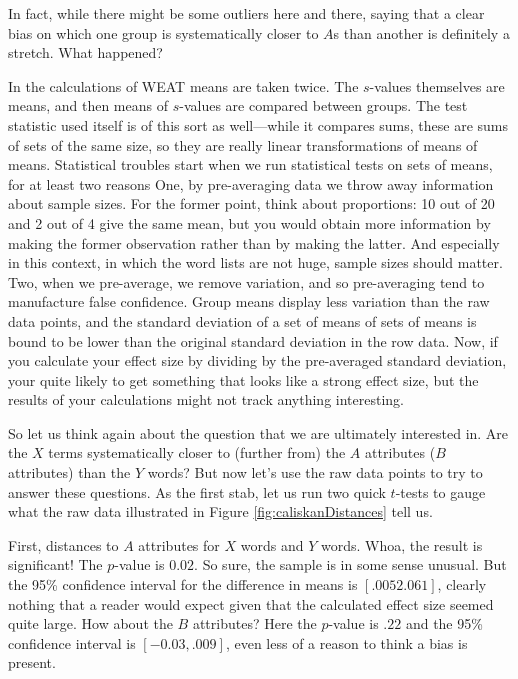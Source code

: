 \documentclass[
  12pt,
  dvipsnames,enabledeprecatedfontcommands]{scrartcl}
\begin{document}
\noindent In fact, while there might be some outliers here and there,
saying that a clear bias on which one group is systematically closer to
\(A\)s than another is definitely a stretch. What happened?

In the calculations of \textsf{WEAT} means are taken twice. The
\(s\)-values themselves are means, and then means of \(s\)-values are
compared between groups. The test statistic used itself is of this sort
as well---while it compares sums, these are sums of sets of the same
size, so they are really linear transformations of means of means.
Statistical troubles start when we run statistical tests on sets of
means, for at least two reasons One, by pre-averaging data we throw away
information about sample sizes. For the former point, think about
proportions: 10 out of 20 and 2 out of 4 give the same mean, but you
would obtain more information by making the former observation rather
than by making the latter. And especially in this context, in which the
word lists are not huge, sample sizes should matter. Two, when we
pre-average, we remove variation, and so pre-averaging tend to
manufacture false confidence. Group means display less variation than
the raw data points, and the standard deviation of a set of means of
sets of means is bound to be lower than the original standard deviation
in the row data. Now, if you calculate your effect size by dividing by
the pre-averaged standard deviation, your quite likely to get something
that looks like a strong effect size, but the results of your
calculations might not track anything interesting.

So let us think again about the question that we are ultimately
interested in. Are the \(X\) terms systematically closer to (further
from) the \(A\) attributes (\(B\) attributes) than the \(Y\) words? But
now let's use the raw data points to try to answer these questions. As
the first stab, let us run two quick \(t\)-tests to gauge what the raw
data illustrated in Figure \ref{fig:caliskanDistances} tell us.

First, distances to \(A\) attributes for \(X\) words and \(Y\) words.
Whoa, the result is significant! The \(p\)-value is \(0.02\). So sure,
the sample is in some sense unusual. But the 95\% confidence interval
for the difference in means is \([.0052 .061]\), clearly nothing that a
reader would expect given that the calculated effect size seemed quite
large. How about the \(B\) attributes? Here the \(p\)-value is \(.22\)
and the 95\% confidence interval is \([-0.03, .009]\), even less of a
reason to think a bias is present.
\end{document}
